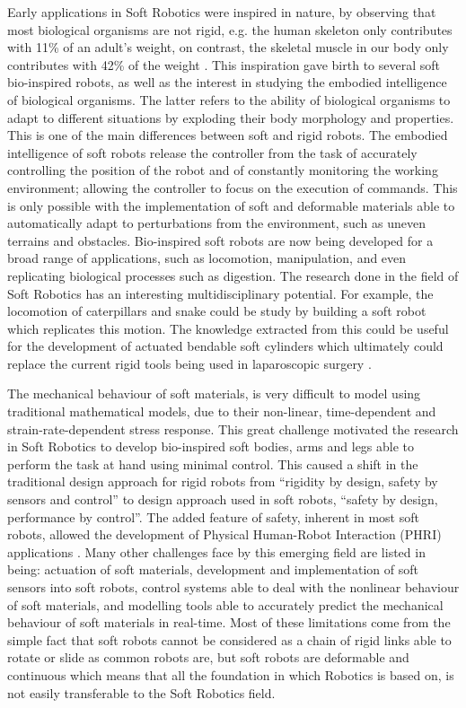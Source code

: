Early applications in Soft Robotics were inspired in nature, by observing that most biological organisms are not rigid, e.g. the human skeleton only contributes with 11\% of an adult's weight, on contrast, the skeletal muscle in our body only contributes with 42\% of the weight \cite{kim2013soft}. This inspiration gave birth to several soft bio-inspired robots, as well as the interest in studying the embodied intelligence of biological organisms. The latter refers to the ability of biological organisms to adapt to different situations by exploding their body morphology and properties. This is one of the main differences between soft and rigid robots. The embodied intelligence of soft robots release the controller from the task of accurately controlling the position of the robot and of constantly monitoring the working environment; allowing the controller to focus on the execution of commands. This is only possible with the implementation of soft and deformable materials able to automatically adapt to perturbations from the environment, such as uneven terrains and obstacles. Bio-inspired soft robots are now being developed for a broad range of applications, such as locomotion, manipulation, and even replicating biological processes such as digestion. The research done in the field of Soft Robotics has an interesting multidisciplinary potential. For example, the locomotion of caterpillars and snake could be study by building a soft robot which replicates this motion. The knowledge extracted from this could be useful for the development of actuated bendable soft cylinders which ultimately could replace the current rigid tools being used in laparoscopic surgery \cite{rus2015design}.

The mechanical behaviour of soft materials, is very difficult to model using traditional mathematical models, due to their non-linear, time-dependent and strain-rate-dependent stress response. This great challenge motivated the research in Soft Robotics to develop bio-inspired soft bodies, arms and legs able to perform the task at hand using minimal control. This caused a shift in the traditional design approach for rigid robots from ``rigidity by design, safety by sensors and control'' to design approach used in soft robots, ``safety by design, performance by control''. The added feature of safety, inherent in most soft robots, allowed the development of Physical Human-Robot Interaction (PHRI) applications \cite{filippini2008toward}. Many other challenges face by this emerging field are listed in \cite{laschi2016soft,trivedi2008soft} being: actuation of soft materials, development and implementation of soft sensors into soft robots, control systems able to deal with the nonlinear behaviour of soft materials, and modelling tools able to accurately predict the mechanical behaviour of soft materials in real-time. Most of these limitations come from the simple fact that soft robots cannot be considered as a chain of rigid links able to rotate or slide as common robots are, but soft robots are deformable and continuous which means that all the foundation in which Robotics is based on, is not easily transferable to the Soft Robotics field. 

